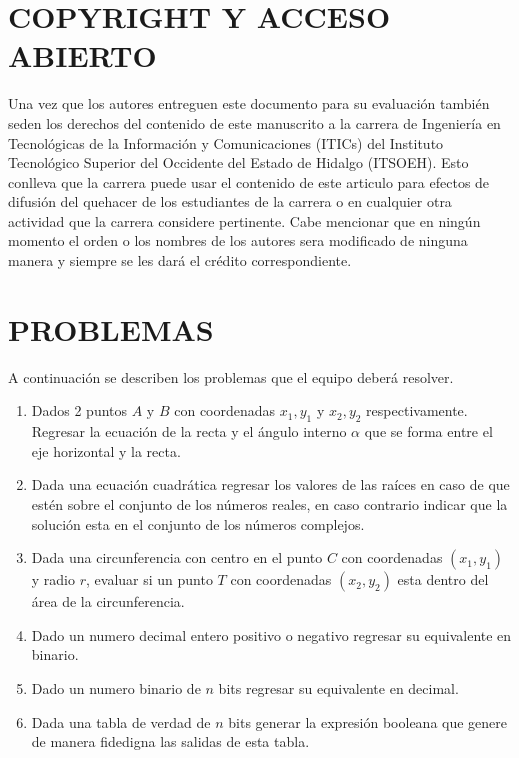 \documentclass{IEEEcsmag}
\begin{document}
\section{COPYRIGHT Y ACCESO ABIERTO}

Una vez que los autores entreguen este documento para su evaluación también seden los derechos del contenido de este manuscrito a la carrera de Ingeniería en Tecnológicas de la Información y Comunicaciones (ITICs) del Instituto Tecnológico Superior del Occidente del Estado de Hidalgo (ITSOEH). Esto conlleva que la carrera puede usar el contenido de este articulo para efectos de difusión del quehacer de los estudiantes de la carrera o en cualquier otra actividad que la carrera considere pertinente. Cabe mencionar que en ningún momento el orden o los nombres de los autores sera modificado de ninguna manera y siempre se les dará el crédito correspondiente. 
\section{PROBLEMAS}
A continuación se describen los problemas que el equipo deberá resolver.
\begin{enumerate}
\item Dados 2 puntos $A \mbox{ y } B$ con coordenadas $x_{1}, y_{1}$ y $x_{2}, y_{2}$  respectivamente. Regresar la ecuación de la recta y el ángulo interno $\alpha$ que se forma entre el eje horizontal y la recta. 
\item Dada una ecuación cuadrática regresar los valores de las raíces en caso de que estén sobre el conjunto de los números reales, en caso contrario indicar que la solución esta en el conjunto de los números complejos. 
\item Dada una circunferencia con centro en el punto $C$ con coordenadas $(x_{1}, y_{1})$ y radio $r$, evaluar si un punto $T$ con coordenadas $(x_{2}, y_{2})$ esta dentro del área de la circunferencia.
\item Dado un numero decimal entero positivo o negativo regresar su equivalente en binario.
\item Dado un numero binario de $n$ bits regresar su equivalente en decimal.
\item Dada una tabla de verdad de $n$ bits generar la expresión booleana que genere de manera fidedigna las salidas de esta tabla.
\end{enumerate}
\end{document}
